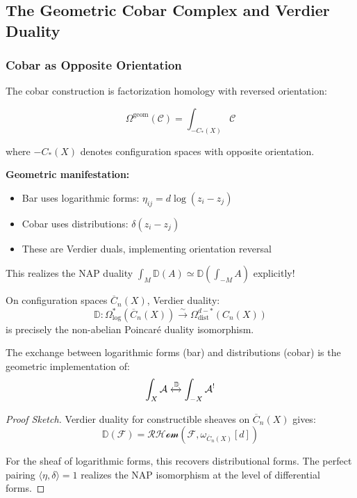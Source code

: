 
\subsection{The Geometric Cobar Complex and Verdier Duality}

\subsubsection{Cobar as Opposite Orientation}

\begin{framework}\label{framework:cobar-orientation}
The cobar construction is factorization homology with reversed orientation:

$$\Omega^{\text{geom}}(\mathcal{C}) = \int_{-C_*(X)} \mathcal{C}$$

where $-C_*(X)$ denotes configuration spaces with opposite orientation.

\textbf{Geometric manifestation:}
\begin{itemize}
\item Bar uses logarithmic forms: $\eta_{ij} = d\log(z_i - z_j)$
\item Cobar uses distributions: $\delta(z_i - z_j)$
\item These are Verdier duals, implementing orientation reversal
\end{itemize}

This realizes the NAP duality $\int_M \mathbb{D}(A) \simeq \mathbb{D}(\int_{-M} A)$ explicitly!
\end{framework}

\begin{theorem}[Verdier Duality = NAP Duality]\label{thm:verdier-NAP}
On configuration spaces $\overline{C}_n(X)$, Verdier duality:
$$\mathbb{D}: \Omega^*_{\log}(\overline{C}_n(X)) \xrightarrow{\sim} \Omega^{d-*}_{\text{dist}}(C_n(X))$$
is precisely the non-abelian Poincaré duality isomorphism.

The exchange between logarithmic forms (bar) and distributions (cobar) is the geometric implementation of:
$$\int_X \mathcal{A} \xleftrightarrow{\mathbb{D}} \int_{-X} \mathcal{A}^!$$
\end{theorem}

\begin{proof}[Proof Sketch]
Verdier duality for constructible sheaves on $\overline{C}_n(X)$ gives:
$$\mathbb{D}(\mathcal{F}) = \mathcal{RHom}(\mathcal{F}, \omega_{\overline{C}_n(X)}[d])$$

For the sheaf of logarithmic forms, this recovers distributional forms. The perfect pairing $\langle \eta, \delta \rangle = 1$ realizes the NAP isomorphism at the level of differential forms.
\end{proof}


